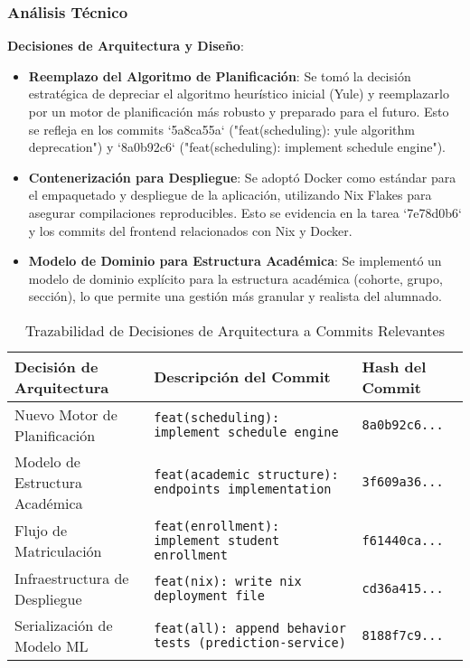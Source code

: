\subsubsection{Análisis Técnico}

\textbf{Decisiones de Arquitectura y Diseño}:
\begin{itemize}
    \item \textbf{Reemplazo del Algoritmo de Planificación}: Se tomó la decisión estratégica de depreciar el algoritmo heurístico inicial (Yule) y reemplazarlo por un motor de planificación más robusto y preparado para el futuro. Esto se refleja en los commits `5a8ca55a` ("feat(scheduling): yule algorithm deprecation") y `8a0b92c6` ("feat(scheduling): implement schedule engine").
    \item \textbf{Contenerización para Despliegue}: Se adoptó Docker como estándar para el empaquetado y despliegue de la aplicación, utilizando Nix Flakes para asegurar compilaciones reproducibles. Esto se evidencia en la tarea `7e78d0b6` y los commits del frontend relacionados con Nix y Docker.
    \item \textbf{Modelo de Dominio para Estructura Académica}: Se implementó un modelo de dominio explícito para la estructura académica (cohorte, grupo, sección), lo que permite una gestión más granular y realista del alumnado.
\end{itemize}

\begin{table}[H]
    \caption{Trazabilidad de Decisiones de Arquitectura a Commits Relevantes}
    \label{tab:sprint-7-commit-traceability}
    \begin{tabularx}{\textwidth}{@{}lXl@{}}
        \toprule
        \textbf{Decisión de Arquitectura} & \textbf{Descripción del Commit} & \textbf{Hash del Commit} \\
        \midrule
        Nuevo Motor de Planificación & \texttt{feat(scheduling): implement schedule engine} & \texttt{8a0b92c6...} \\
        Modelo de Estructura Académica & \texttt{feat(academic structure): endpoints implementation} & \texttt{3f609a36...} \\
        Flujo de Matriculación & \texttt{feat(enrollment): implement student enrollment} & \texttt{f61440ca...} \\
        Infraestructura de Despliegue & \texttt{feat(nix): write nix deployment file} & \texttt{cd36a415...} \\
        Serialización de Modelo ML & \texttt{feat(all): append behavior tests (prediction-service)} & \texttt{8188f7c9...} \\
        \bottomrule
    \end{tabularx}
\end{table}


